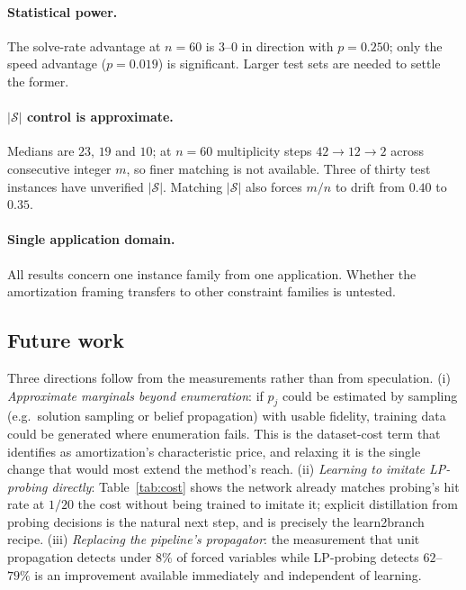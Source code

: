 \documentclass[12pt]{article}
\begin{document}
\paragraph{Statistical power.} The solve-rate advantage at $n=60$ is $3$--$0$ in direction with $p=0.250$; only the speed advantage ($p=0.019$) is significant. Larger test sets are needed to settle the former.

\paragraph{$|\mathcal{S}|$ control is approximate.} Medians are $23$, $19$ and $10$; at $n=60$ multiplicity steps $42\to12\to2$ across consecutive integer $m$, so finer matching is not available. Three of thirty test instances have unverified $|\mathcal{S}|$. Matching $|\mathcal{S}|$ also forces $m/n$ to drift from $0.40$ to $0.35$.

\paragraph{Single application domain.} All results concern one instance family from one application. Whether the amortization framing transfers to other constraint families is untested.

\subsection{Future work}

Three directions follow from the measurements rather than from speculation. (i) \emph{Approximate marginals beyond enumeration}: if $p_j$ could be estimated by sampling (e.g.\ solution sampling or belief propagation) with usable fidelity, training data could be generated where enumeration fails. This is the dataset-cost term that \citet{millidge2022deconfusing} identifies as amortization's characteristic price, and relaxing it is the single change that would most extend the method's reach. (ii) \emph{Learning to imitate LP-probing directly}: Table~\ref{tab:cost} shows the network already matches probing's hit rate at $1/20$ the cost without being trained to imitate it; explicit distillation from probing decisions is the natural next step, and is precisely the learn2branch recipe. (iii) \emph{Replacing the pipeline's propagator}: the measurement that unit propagation detects under $8\%$ of forced variables while LP-probing detects $62$--$79\%$ is an improvement available immediately and independent of learning.
\end{document}
